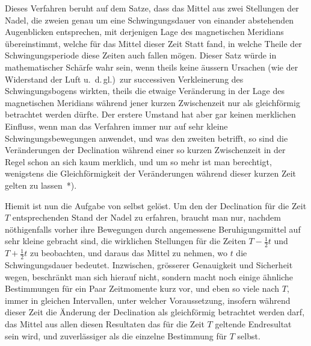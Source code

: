 \documentclass[12pt,a4paper]{article}
\begin{document}
\newpage
\noindent
Dieses Verfahren beruht auf dem Satze, dass das Mittel aus zwei Stellungen der Nadel, die zweien genau um eine Schwingungsdauer von einander abstehenden Augenblicken entsprechen, mit derjenigen Lage des magnetischen Meridians \"ubereinstimmt, welche f\"ur das Mittel dieser Zeit Statt fand, in welche Theile der Schwingungsperiode diese Zeiten auch fallen m\"ogen. Dieser Satz w\"urde in mathematischer Sch\"arfe wahr sein, wenn theils keine \"aussern Ursachen (wie der Widerstand der Luft u.~d.\,gl.)\ zur successiven Verkleinerung des Schwingungsbogens wirkten, theils die etwaige Ver\"anderung in der Lage des magnetischen Meridians w\"ahrend jener kurzen Zwischenzeit nur als gleichf\"ormig betrachtet werden d\"urfte. Der erstere Umstand hat aber gar keinen merklichen Einfluss, wenn man das Verfahren immer nur auf sehr kleine Schwingungsbewegungen anwendet, und was den zweiten betrifft, so sind die Ver\"anderungen der Declination w\"ahrend einer so kurzen Zwischenzeit in der Regel schon an sich kaum merklich, und um so mehr ist man berechtigt, wenigstens die Gleichf\"ormigkeit der Ver\"anderungen w\"ahrend dieser kurzen Zeit gelten zu lassen~*).


Hiemit ist nun die Aufgabe von selbst gel\"ost. Um den der Declination f\"ur die Zeit $T$ entsprechenden Stand der Nadel zu erfahren, braucht man nur, nachdem n\"othigenfalls vorher ihre Bewegungen durch angemessene Beruhigungsmittel auf sehr kleine gebracht sind, die wirklichen Stellungen f\"ur die Zeiten $T-\tfrac{1}{2}t$ und $T+\tfrac{1}{2}t$ zu beobachten, und daraus das Mittel zu nehmen, wo $t$ die Schwingungsdauer bedeutet. Inzwischen, gr\"osserer Genauigkeit und Sicherheit wegen, beschr\"ankt man sich hierauf nicht, sondern macht noch einige \"ahnliche Bestimmungen f\"ur ein Paar Zeitmomente kurz vor, und eben so viele nach $T$, immer in gleichen Intervallen, unter welcher Voraussetzung, insofern w\"ahrend dieser Zeit die \"Anderung der Declination als gleichf\"ormig betrachtet werden darf, das Mittel aus allen diesen Resultaten das f\"ur die Zeit $T$ geltende Endresultat sein wird, und zuverl\"assiger als die einzelne Bestimmung f\"ur $T$ selbst.
\end{document}

